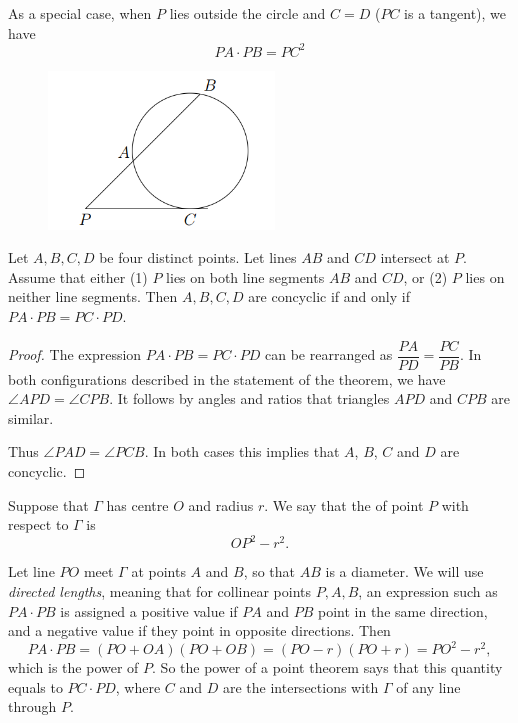 As a special case, when $P$ lies outside the circle and $C=D$ ($PC$ is a tangent), we have \begin{equation} PA \cdot PB = PC^2 \end{equation}

\begin{figure}[H]
    \centering
    \includegraphics[width=6cm]{images/Power_of_a_point2.png}
\end{figure}
\pagebreak

\begin{theorem}
Let $A, B, C, D$ be four distinct points. Let lines $AB$ and $CD$ intersect at $P$. Assume that either (1) $P$ lies on both line segments $AB$ and $CD$, or (2) $P$ lies on neither line segments. Then $A, B, C, D$ are concyclic if and only if $PA \cdot PB = PC \cdot PD$.
\end{theorem}

\begin{proof}
The expression $PA \cdot PB = PC \cdot PD$ can be rearranged as $\dfrac{PA}{PD} = \dfrac{PC}{PB}$. In both configurations described in the statement of the theorem, we have $\angle APD = \angle CPB$. It follows by angles and ratios that triangles $APD$ and $CPB$ are similar.

Thus $\angle PAD = \angle PCB$. In both cases this implies that $A$, $B$, $C$ and $D$ are concyclic.
\end{proof}

\begin{definition}
Suppose that $\Gamma$ has centre $O$ and radius $r$. We say that the  of point $P$ with respect to $\Gamma$ is
\[ OP^2-r^2. \]
\end{definition}

Let line $PO$ meet $\Gamma$ at points $A$ and $B$, so that $AB$ is a diameter. We will use \emph{directed lengths}, meaning that for collinear points $P, A, B$, an expression such as $PA \cdot PB$ is assigned a positive value if $PA$ and $PB$ point in the same direction, and a negative value if they point in opposite directions. Then
\[ PA \cdot P B = (PO + OA)(PO + OB) = (PO-r)(PO+r) = PO^2-r^2, \]
which is the power of $P$. So the power of a point theorem says that this quantity equals to $PC \cdot PD$, where $C$ and $D$ are the intersections with $\Gamma$ of any line through $P$.


